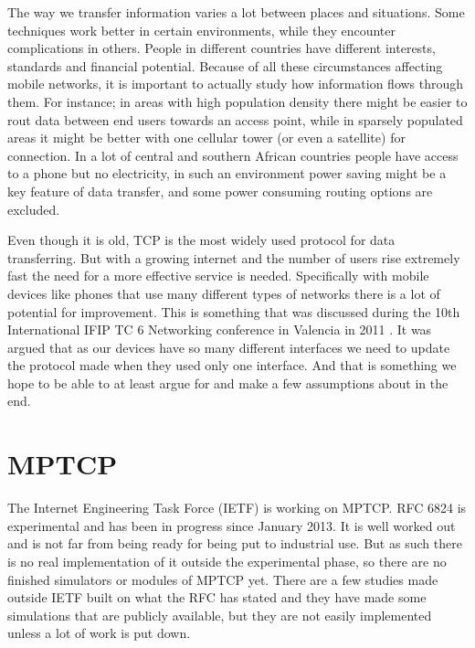 \documentclass[11pt,twocolumn]{article}
\begin{document}
The way we transfer information varies a lot between places and situations. Some techniques work better in certain environments, while they encounter complications in others. People in different countries have different interests, standards and financial potential. Because of all these circumstances affecting mobile networks, it is important to actually study how information flows through them. For instance; in areas with high population density there might be easier to rout data between end users towards an access point, while in sparsely populated areas it might be better with one cellular tower (or even a satellite) for connection. In a lot of central and southern African countries people have access to a phone but no electricity, in such an environment power saving might be a key feature of data transfer, and some power consuming routing options are excluded.

Even though it is old, TCP is the most widely used protocol for data transferring. But with a growing internet and the number of users rise extremely fast the need for a more effective service is needed. Specifically with mobile devices like phones that use many different types of networks there is a lot of potential for improvement. This is something that was discussed during the 10th International IFIP TC 6 Networking conference in Valencia in 2011 \cite{RFC6824}. It was argued that as our devices have so many different interfaces we need to update the protocol made when they used only one interface. And that is something we hope to be able to at least argue for and make a few assumptions about in the end.



\section{MPTCP}
The Internet Engineering Task Force (IETF) is working on MPTCP. RFC 6824 is experimental and has been in progress since January 2013. It is well worked out and is not far from being ready for being put to industrial use. But as such there is no real implementation of it outside the experimental phase, so there are no finished simulators or modules of MPTCP yet. There are a few studies made outside IETF built on what the RFC has stated and they have made some simulations that are publicly available, but they are not easily implemented unless a lot of work is put down.
\end{document}
